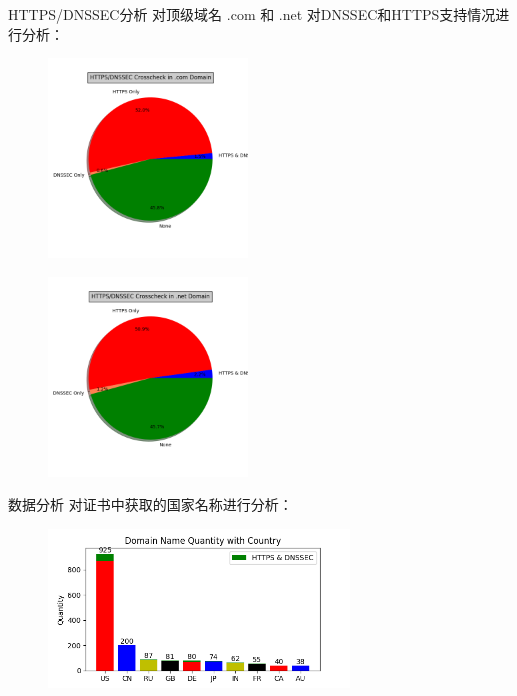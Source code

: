 \documentclass{beamer}
\begin{document}
  \begin{frame}{HTTPS/DNSSEC分析}
  对顶级域名 .com 和 .net 对DNSSEC和HTTPS支持情况进行分析：
    \begin{figure}[htbp]
      \centering
      \begin{minipage}[htbp]{150pt}
        \centering
        \includegraphics[width=150pt]{images/figure/httpsdnsseccom.png}
        \label{fig:4}
      \end{minipage}
      \hspace{10pt}%
      \begin{minipage}[htpb]{150pt}
        \centering
        \includegraphics[width=150pt]{images/figure/httpsdnssecnet.png}
        \label{fig:5}
      \end{minipage}
      \end{figure}
  
  
  \end{frame}
  \begin{frame}{数据分析}
    对证书中获取的国家名称进行分析：
    \begin{figure}
      \includegraphics[width=8cm]{images/figure/quantitycountry2.png}
    \end{figure}
  
    \end{frame}
\end{document}
